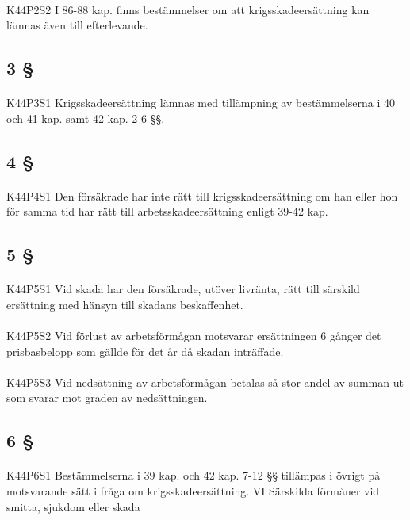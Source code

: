 \documentclass[a4paper,notitlepage,openany,10pt]{book}
\begin{document}
\paragraph*{}
{\tiny K44P2S2}
I 86-88 kap. finns bestämmelser om att krigsskadeersättning kan lämnas även till efterlevande.
\subsection*{3 §}
\paragraph*{}
{\tiny K44P3S1}
Krigsskadeersättning lämnas med tillämpning av bestämmelserna i 40 och 41 kap. samt 42 kap. 2-6 §§.
\subsection*{4 §}
\paragraph*{}
{\tiny K44P4S1}
Den försäkrade har inte rätt till krigsskadeersättning om han eller hon för samma tid har rätt till arbetsskadeersättning enligt 39-42 kap.
\subsection*{5 §}
\paragraph*{}
{\tiny K44P5S1}
Vid skada har den försäkrade, utöver livränta, rätt till särskild ersättning med hänsyn till skadans beskaffenhet.
\paragraph*{}
{\tiny K44P5S2}
Vid förlust av arbetsförmågan motsvarar ersättningen 6 gånger det prisbasbelopp som gällde för det år då skadan inträffade.
\paragraph*{}
{\tiny K44P5S3}
Vid nedsättning av arbetsförmågan betalas så stor andel av summan ut som svarar mot graden av nedsättningen.
\subsection*{6 §}
\paragraph*{}
{\tiny K44P6S1}
Bestämmelserna i 39 kap. och 42 kap. 7-12 §§ tillämpas i övrigt på motsvarande sätt i fråga om krigsskadeersättning.
VI Särskilda förmåner vid smitta, sjukdom eller skada
\end{document}

